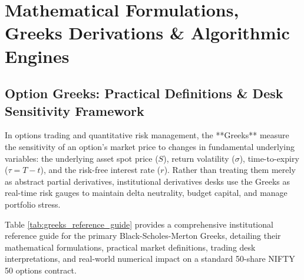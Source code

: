 \chapter{Mathematical Formulations, Greeks Derivations \& Algorithmic Engines}
\label{chap:algorithms}

\section{Option Greeks: Practical Definitions \& Desk Sensitivity Framework}
\label{sec:greeks_definitions}

In options trading and quantitative risk management, the **Greeks** measure the sensitivity of an option's market price to changes in fundamental underlying variables: the underlying asset spot price ($S$), return volatility ($\sigma$), time-to-expiry ($\tau = T - t$), and the risk-free interest rate ($r$). Rather than treating them merely as abstract partial derivatives, institutional derivatives desks use the Greeks as real-time risk gauges to maintain delta neutrality, budget capital, and manage portfolio stress.

Table \ref{tab:greeks_reference_guide} provides a comprehensive institutional reference guide for the primary Black-Scholes-Merton Greeks, detailing their mathematical formulations, practical market definitions, trading desk interpretations, and real-world numerical impact on a standard 50-share NIFTY 50 options contract.

